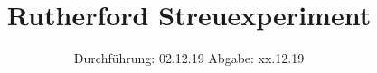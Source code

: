 

\subject{V16}
\title{Rutherford Streuexperiment}
\date{
  Durchführung: 02.12.19
  \hspace{3em}
  Abgabe: xx.12.19
}



\maketitle
\thispagestyle{empty}
\tableofcontents
\newpage




%



\newpage
\printbibliography


